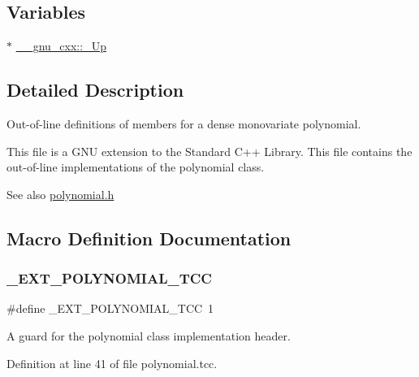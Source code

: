 \subsection*{Variables}
\begin{DoxyCompactItemize}
\item 
$\ast$ \hyperlink{namespace____gnu__cxx_ab693ea357b6429b331e0bf09f9442385}{\+\_\+\+\_\+gnu\+\_\+cxx\+::\+\_\+\+Up}
\end{DoxyCompactItemize}


\subsection{Detailed Description}
Out-\/of-\/line definitions of members for a dense monovariate polynomial.

This file is a G\+NU extension to the Standard C++ Library. This file contains the out-\/of-\/line implementations of the polynomial class.

\begin{DoxySeeAlso}{See also}
\hyperlink{polynomial_8h}{polynomial.\+h} 
\end{DoxySeeAlso}


\subsection{Macro Definition Documentation}
\mbox{\label{polynomial_8tcc_af5a65c717a211a48a4cf31df10b4537a}} 
\subsubsection{\texorpdfstring{\+\_\+\+E\+X\+T\+\_\+\+P\+O\+L\+Y\+N\+O\+M\+I\+A\+L\+\_\+\+T\+CC}{\_EXT\_POLYNOMIAL\_TCC}}
{\footnotesize\ttfamily \#define \+\_\+\+E\+X\+T\+\_\+\+P\+O\+L\+Y\+N\+O\+M\+I\+A\+L\+\_\+\+T\+CC~1}



A guard for the polynomial class implementation header. 



Definition at line 41 of file polynomial.\+tcc.

